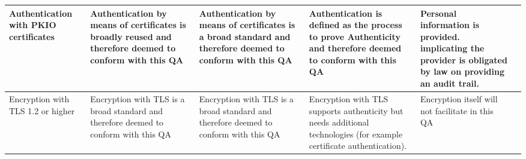 \begin{longtable}[c]{|p{3cm}|p{3cm}|p{3cm}|p{3cm}|p{3cm}|p{3cm}|}
 \hline
  Authentication with PKIO certificates & Authentication by means of certificates is broadly reused and therefore deemed to conform with this QA & Authentication by means of certificates is a broad standard and therefore deemed to conform with this QA & Authentication is defined as the process to prove Authenticity and therefore deemed to conform with this QA & Personal information is provided. implicating the provider is obligated by law \cite{GDPR} on providing an audit trail.\\
 \hline
 Encryption with TLS 1.2 or higher & Encryption with TLS is a broad standard and therefore deemed to conform with this QA & Encryption with TLS is a broad standard and therefore deemed to conform with this QA & Encryption with TLS supports authenticity but needs additional technologies (for example certificate authentication).  & Encryption itself will not facilitate in this QA \\
 \hline
\end{longtable}

